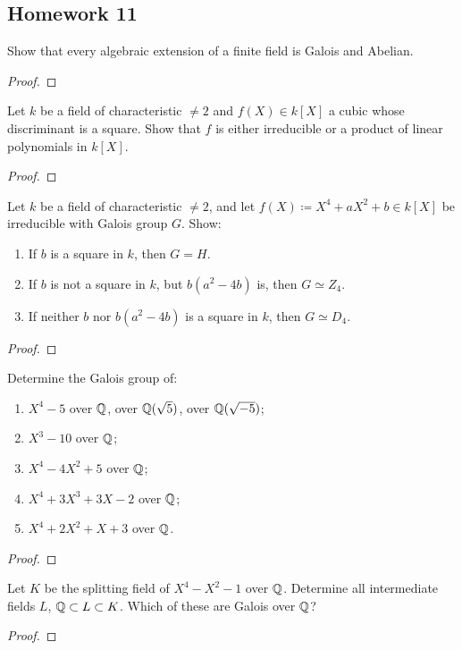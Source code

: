 \subsection{Homework 11}
\begin{problem}
Show that every algebraic extension of a finite field is Galois and
Abelian.
\end{problem}
\begin{proof}
\end{proof}

\begin{problem}
Let $k$ be a field of characteristic $\neq 2$ and $f(X)\in k[X]$ a cubic
whose discriminant is a square. Show that $f$ is either irreducible or a
product of linear polynomials in $k[X]$.
\end{problem}
\begin{proof}
\end{proof}

\begin{problem}
Let $k$ be a field of characteristic $\neq 2$, and let $f(X)\coloneq
X^4+aX^2+b\in k[X]$ be irreducible with Galois group $G$. Show:
\begin{enumerate}[label=(\roman*),noitemsep]
\item If $b$ is a square in $k$, then $G=H$.
\item If $b$ is not a square in $k$, but $b(a^2-4b)$ is, then $G\simeq
  Z_4$.
\item If neither $b$ nor $b(a^2-4b)$ is a square in $k$, then $G\simeq
  D_4$.
\end{enumerate}
\end{problem}
\begin{proof}
\end{proof}

\begin{problem}
Determine the Galois group of:
\begin{enumerate}[label=(\alph*),noitemsep]
\item $X^4-5$ over $\mathbb{Q}$, over $\mathbb{Q}(\sqrt{5})$, over $\mathbb{Q}(\sqrt{-5})$;
\item $X^3-10$ over $\mathbb{Q}$;
\item $X^4-4X^2+5$ over $\mathbb{Q}$;
\item $X^4+3X^3+3X-2$ over $\mathbb{Q}$;
\item $X^4+2X^2+X+3$ over $\mathbb{Q}$.
\end{enumerate}
\end{problem}
\begin{proof}
\end{proof}

\begin{problem}
Let $K$ be the splitting field of $X^4-X^2-1$ over $\mathbb{Q}$. Determine all
intermediate fields $L$, $\mathbb{Q}\subset L\subset K$. Which of these are
Galois over $\mathbb{Q}$?
\end{problem}
\begin{proof}
\end{proof}

